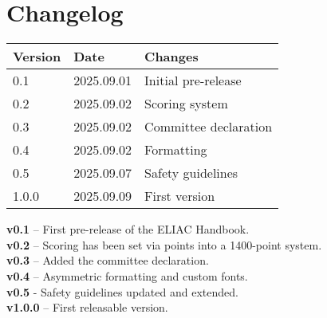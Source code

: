 
\section*{Changelog}

\begin{tabular}{lll}
\toprule
Version & Date & Changes \\ \midrule
0.1 & 2025.09.01 & Initial pre-release \\ \midrule
0.2 & 2025.09.02 & Scoring system\\ \midrule
0.3 & 2025.09.02 & Committee declaration\\ \midrule
0.4 & 2025.09.02 & Formatting\\ \midrule
0.5 & 2025.09.07 & Safety guidelines\\ \midrule
1.0.0 & 2025.09.09 & First version\\ \bottomrule
\end{tabular}

\vspace{1cm}

\noindent\textbf{v0.1} – First pre-release of the ELIAC Handbook.\\
\noindent\textbf{v0.2} – Scoring has been set via points into a 1400-point system.\\
\noindent\textbf{v0.3} – Added the committee declaration.\\
\noindent\textbf{v0.4} – Asymmetric formatting and custom fonts.\\
\noindent\textbf{v0.5} - Safety guidelines updated and extended.\\
\noindent\textbf{v1.0.0} – First releasable version.
